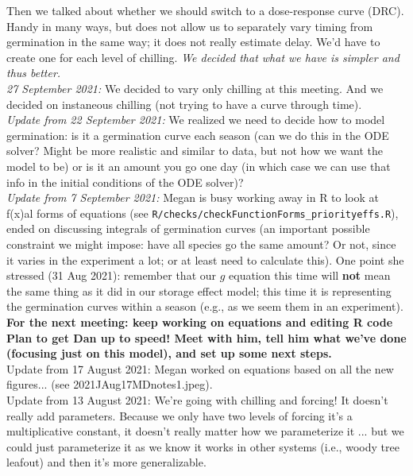 \documentclass[11pt,letter]{article}
\begin{document}
Then we talked about whether we should switch to a dose-response curve (DRC). Handy in many ways, but does not allow us to separately vary timing from germination in the same way; it does not really estimate delay. We'd have to create one for each level of chilling. \emph{We decided that what we have is simpler and thus better.} \\

\emph{27 September 2021:} We decided to vary only chilling at this meeting. And we decided on instaneous chilling (not trying to have a curve through time).\\

\emph{Update from 22 September 2021:} We realized we need to decide how to model germination: is it a germination curve each season (can we do this in the ODE solver? Might be more realistic and similar to data, but not how we want the model to be) or is it an amount you go one day (in which case we can use that info in the initial conditions of the ODE solver)?\\

\emph{Update from 7 September 2021:} Megan is busy working away in R to look at f(x)al forms of equations (see \verb|R/checks/checkFunctionForms_priorityeffs.R|), ended on discussing integrals of germination curves (an important possible constraint we might impose: have all species go the same amount? Or not, since it varies in the experiment a lot; or at least need to calculate this). One point she stressed (31 Aug 2021): remember that our $g$ equation this time will {\bf not} mean the same thing as it did in our storage effect model; this time it is representing the germination curves within a season (e.g., as we seem them in an experiment). {\bf For the next meeting: keep working on equations and editing R code}\\

 {\bf Plan to get Dan up to speed! Meet with him, tell him what we've done (focusing just on this model), and set up some next steps. } \\

Update from 17 August 2021: Megan worked on equations based on all the new figures... (see 2021JAug17MDnotes1.jpeg).\\

Update from 13 August 2021: We're going with chilling and forcing! It doesn't really add parameters. Because we only have two levels of forcing it's a multiplicative constant, it doesn't really matter how we parameterize it ... but we could just parameterize it as we know it works in other systems (i.e., woody tree leafout) and then it's more generalizable. \\
\end{document}
